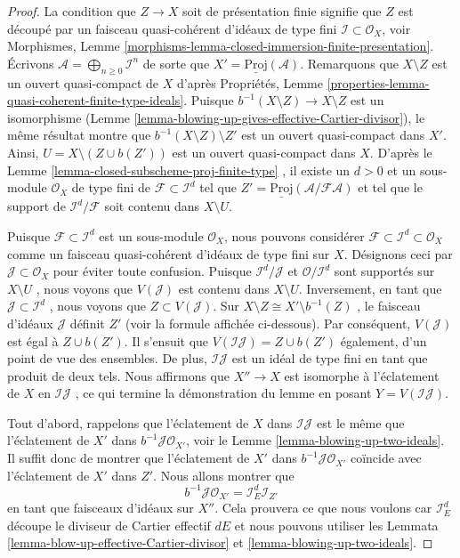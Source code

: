 \begin{proof}
La condition que  $Z \to X$  soit de présentation finie signifie que  $Z$ 
est découpé par un faisceau quasi-cohérent d'idéaux de type fini  $\mathcal{I} \subset \mathcal{O}_X$,
voir Morphismes, Lemme  \ref{morphisms-lemma-closed-immersion-finite-presentation}. Écrivons  $\mathcal{A} = \bigoplus_{n \geq 0} \mathcal{I}^n$  de sorte que
 $X' = \underline{\text{Proj}}(\mathcal{A})$. Remarquons que  $X \setminus Z$  est un ouvert quasi-compact de
 $X$  d'après Propriétés, Lemme  \ref{properties-lemma-quasi-coherent-finite-type-ideals}. Puisque  $b^{-1}(X \setminus Z) \to X \setminus Z$  est un
isomorphisme (Lemme  \ref{lemma-blowing-up-gives-effective-Cartier-divisor}), le même résultat montre que  $b^{-1}(X \setminus Z) \setminus Z'$  est un
ouvert quasi-compact dans  $X'$. Ainsi,  $U = X \setminus (Z \cup b(Z'))$  est un ouvert
quasi-compact dans  $X$. D'après le Lemme  \ref{lemma-closed-subscheme-proj-finite-type} , il existe un
 $d > 0$  et un sous-module  $\mathcal{O}_X$ de type fini de  $\mathcal{F} \subset \mathcal{I}^d$  tel que
 $Z' = \underline{\text{Proj}}(\mathcal{A}/\mathcal{F}\mathcal{A})$  et tel que le support de  $\mathcal{I}^d/\mathcal{F}$  soit contenu dans  $X \setminus U$.

\medskip\noindent
Puisque  $\mathcal{F} \subset \mathcal{I}^d$  est un sous-module  $\mathcal{O}_X$, nous pouvons considérer
 $\mathcal{F} \subset \mathcal{I}^d \subset \mathcal{O}_X$  comme un faisceau quasi-cohérent d'idéaux de type fini sur
 $X$. Désignons ceci par  $\mathcal{J} \subset \mathcal{O}_X$  pour éviter toute confusion. Puisque
 $\mathcal{I}^d / \mathcal{J}$  et  $\mathcal{O}/\mathcal{I}^d$  sont supportés sur  $X \setminus U$ , nous voyons que
 $V(\mathcal{J})$  est contenu dans  $X \setminus U$. Inversement, en tant que  $\mathcal{J} \subset \mathcal{I}^d$ ,
nous voyons que  $Z \subset V(\mathcal{J})$. Sur  $X \setminus Z \cong X' \setminus b^{-1}(Z)$ , le faisceau d'idéaux  $\mathcal{J}$ 
définit  $Z'$  (voir la formule affichée ci-dessous). Par conséquent,
 $V(\mathcal{J})$  est égal à  $Z \cup b(Z')$. Il s'ensuit que  $V(\mathcal{I}\mathcal{J}) = Z \cup b(Z')$  également, d'un
point de vue des ensembles. De plus,  $\mathcal{I}\mathcal{J}$  est un idéal de type fini en
tant que produit de deux tels. Nous affirmons que  $X'' \to X$  est isomorphe à
l'éclatement de  $X$  en  $\mathcal{I}\mathcal{J}$ , ce qui termine la démonstration du
lemme en posant  $Y = V(\mathcal{I}\mathcal{J})$.

\medskip\noindent
Tout d'abord, rappelons que l'éclatement de  $X$  dans  $\mathcal{I}\mathcal{J}$  est le
même que l'éclatement de  $X'$  dans  $b^{-1}\mathcal{J} \mathcal{O}_{X'}$, voir le Lemme
 \ref{lemma-blowing-up-two-ideals}. Il suffit donc de montrer que l'éclatement de  $X'$  dans
 $b^{-1}\mathcal{J} \mathcal{O}_{X'}$  coïncide avec l'éclatement de  $X'$  dans  $Z'$. Nous
allons montrer que
$$
b^{-1}\mathcal{J} \mathcal{O}_{X'} = \mathcal{I}_E^d \mathcal{I}_{Z'}
$$
en tant que faisceaux d'idéaux sur  $X''$. Cela prouvera ce que nous voulons
car  $\mathcal{I}_E^d$  découpe le diviseur de Cartier effectif  $dE$  et nous
pouvons utiliser les Lemmata  \ref{lemma-blow-up-effective-Cartier-divisor}  et  \ref{lemma-blowing-up-two-ideals}.


\end{proof}
